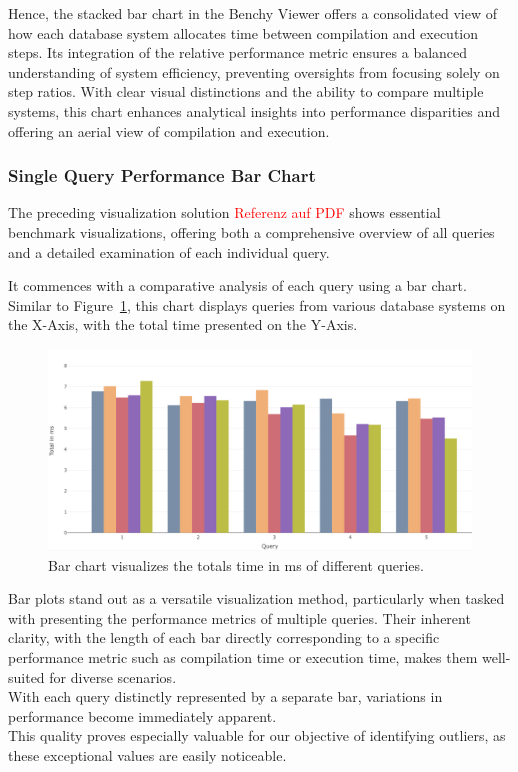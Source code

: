 Hence, the stacked bar chart in the Benchy Viewer offers a consolidated view of how each database system allocates time between compilation and execution steps. Its integration of the relative performance metric ensures a balanced understanding of system efficiency, preventing oversights from focusing solely on step ratios. With clear visual distinctions and the ability to compare multiple systems, this chart enhances analytical insights into performance disparities and offering an aerial view of compilation and execution.


\subsubsection{Single Query Performance Bar Chart}

The preceding visualization solution \textcolor{red}{Referenz auf PDF} shows essential benchmark visualizations, offering both a comprehensive overview of all queries and a detailed examination of each individual query.

It commences with a comparative analysis of each query using a bar chart. Similar to Figure~\ref{fig:bar-chart}, this chart displays queries from various database systems on the X-Axis, with the total time presented on the Y-Axis. 

\begin{figure}[h]
    \centering
    \includegraphics[width=1\linewidth]{figures/bsp-bar.png}
    \caption{Bar chart visualizes the totals time in ms of different queries.}
    \label{fig:bar-chart}
  \end{figure}

Bar plots stand out as a versatile visualization method, particularly when tasked with presenting the performance metrics of multiple queries. Their inherent clarity, with the length of each bar directly corresponding to a specific performance metric such as compilation time or execution time, makes them well-suited for diverse scenarios.\\
With each query distinctly represented by a separate bar, variations in performance become immediately apparent.\\
This quality proves especially valuable for our objective of identifying outliers, as these exceptional values are easily noticeable.


